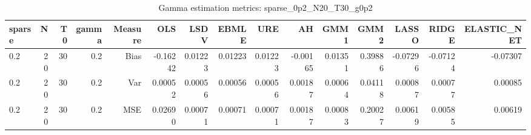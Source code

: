 \begin{table}[!htbp]\centering
\caption{Gamma estimation metrics: sparse_0p2_N20_T30_g0p2}
\label{tab:table1_sparse_0p2_N20_T30_g0p2}
\begin{tabular}{lrrrrrrrrrrrrrr}
\hline
sparse & N & T0 & gamma & Measure & OLS & LSDV & EBMLE & URE & AH & GMM1 & GMM2 & LASSO & RIDGE & ELASTIC_NET \\
\hline
0.2 & 20 & 30 & 0.2 & Bias & -0.16242 & 0.01223 & 0.01223 & 0.01223 & -0.00165 & 0.01351 & 0.39886 & -0.07296 & -0.07124 & -0.07307 \\
0.2 & 20 & 30 & 0.2 & Var & 0.00052 & 0.00056 & 0.00056 & 0.00056 & 0.00187 & 0.00064 & 0.04118 & 0.00087 & 0.00077 & 0.00085 \\
0.2 & 20 & 30 & 0.2 & MSE & 0.02690 & 0.00071 & 0.00071 & 0.00071 & 0.00187 & 0.00083 & 0.20027 & 0.00619 & 0.00585 & 0.00619 \\
\hline
\end{tabular}
\end{table}

